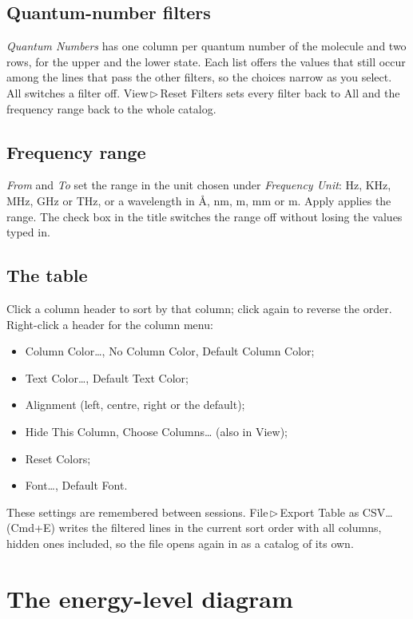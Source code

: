 \documentclass[11pt]{article}
\newcommand{\menu}[1]{\textsf{#1}}
\newcommand{\key}[1]{\textsf{#1}}
\newcommand{\then}{\,$\triangleright$\,}
\begin{document}
\subsection{Quantum-number filters}
\emph{Quantum Numbers} has one column per quantum number of the molecule and two rows, for the
upper and the lower state. Each list offers the values that still occur among the lines that pass
the other filters, so the choices narrow as you select. \menu{All} switches a filter off.
\menu{View\then Reset Filters} sets every filter back to \menu{All} and the frequency range back
to the whole catalog.

\subsection{Frequency range}
\emph{From} and \emph{To} set the range in the unit chosen under \emph{Frequency Unit}: Hz, KHz,
MHz, GHz or THz, or a wavelength in \AA, nm, \textmu m, mm or m. \menu{Apply} applies the range.
The check box in the title switches the range off without losing the values typed in.

\subsection{The table}
Click a column header to sort by that column; click again to reverse the order. Right-click a
header for the column menu:
\begin{itemize}[nosep]
  \item \menu{Column Color\dots}, \menu{No Column Color}, \menu{Default Column Color};
  \item \menu{Text Color\dots}, \menu{Default Text Color};
  \item \menu{Alignment} (left, centre, right or the default);
  \item \menu{Hide This Column}, \menu{Choose Columns\dots} (also in \menu{View});
  \item \menu{Reset Colors};
  \item \menu{Font\dots}, \menu{Default Font}.
\end{itemize}
These settings are remembered between sessions. \menu{File\then Export Table as CSV\dots}
(\key{Cmd+E}) writes the filtered lines in the current sort order with all columns, hidden ones
included, so the file opens again in \AppName{} as a catalog of its own.

\section{The energy-level diagram}
\end{document}

